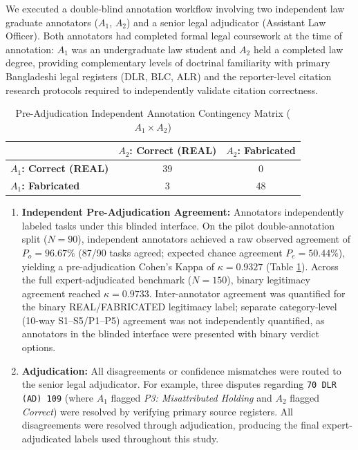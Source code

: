 \documentclass[conference]{IEEEtran}
\begin{document}
We executed a double-blind annotation workflow involving two independent law graduate annotators ($A_1$, $A_2$) and a senior legal adjudicator (Assistant Law Officer). Both annotators had completed formal legal coursework at the time of annotation: $A_1$ was an undergraduate law student and $A_2$ held a completed law degree, providing complementary levels of doctrinal familiarity with primary Bangladeshi legal registers (DLR, BLC, ALR) and the reporter-level citation research protocols required to independently validate citation correctness.

\begin{table}[htbp]
\caption{Pre-Adjudication Independent Annotation Contingency Matrix ($A_1 \times A_2$)}
\label{tab:annotation_contingency}
\centering
\begin{tabular}{lcc}
\toprule
 & \textbf{$A_2$: Correct (REAL)} & \textbf{$A_2$: Fabricated} \\
\midrule
\textbf{$A_1$: Correct (REAL)} & 39 & 0 \\
\textbf{$A_1$: Fabricated} & 3 & 48 \\
\bottomrule
\end{tabular}
\end{table}

\begin{enumerate}
\item \textbf{Independent Pre-Adjudication Agreement:} Annotators independently labeled tasks under this blinded interface. On the pilot double-annotation split ($N=90$), independent annotators achieved a raw observed agreement of $P_o = 96.67\%$ (87/90 tasks agreed; expected chance agreement $P_e = 50.44\%$), yielding a pre-adjudication Cohen's Kappa of $\kappa = 0.9327$ (Table \ref{tab:annotation_contingency}). Across the full expert-adjudicated benchmark ($N=150$), binary legitimacy agreement reached $\kappa = 0.9733$. Inter-annotator agreement was quantified for the binary REAL/FABRICATED legitimacy label; separate category-level (10-way S1--S5/P1--P5) agreement was not independently quantified, as annotators in the blinded interface were presented with binary verdict options.
\item \textbf{Adjudication:} All disagreements or confidence mismatches were routed to the senior legal adjudicator. For example, three disputes regarding \texttt{70 DLR (AD) 109} (where $A_1$ flagged \textit{P3: Misattributed Holding} and $A_2$ flagged \textit{Correct}) were resolved by verifying primary source registers. All disagreements were resolved through adjudication, producing the final expert-adjudicated labels used throughout this study.
\end{enumerate}
\end{document}
